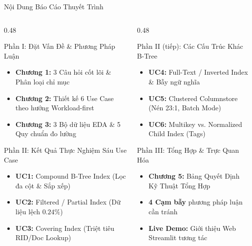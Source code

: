 \documentclass[aspectratio=169,9pt]{beamer}
\begin{document}
\begin{frame}{Nội Dung Báo Cáo Thuyết Trình}
\begin{columns}[T]
\begin{column}{0.48\textwidth}
\begin{block}{Phần I: Đặt Vấn Đề \& Phương Pháp Luận}
\begin{itemize}
  \item \textbf{Chương 1:} 3 Câu hỏi cốt lõi \& Phân loại chỉ mục
  \item \textbf{Chương 2:} Thiết kế 6 Use Case theo hướng Workload-first
  \item \textbf{Chương 3:} 3 Bộ dữ liệu EDA \& 5 Quy chuẩn đo lường
\end{itemize}
\end{block}
\begin{block}{Phần II: Kết Quả Thực Nghiệm Sáu Use Case}
\begin{itemize}
  \item \textbf{UC1:} Compound B-Tree Index (Lọc đa cột \& Sắp xếp)
  \item \textbf{UC2:} Filtered / Partial Index (Dữ liệu lệch $0.24\%$)
  \item \textbf{UC3:} Covering Index (Triệt tiêu RID/Doc Lookup)
\end{itemize}
\end{block}
\end{column}

\begin{column}{0.48\textwidth}
\begin{block}{Phần II (tiếp): Các Cấu Trúc Khác B-Tree}
\begin{itemize}
  \item \textbf{UC4:} Full-Text / Inverted Index \& Bẫy ngữ nghĩa
  \item \textbf{UC5:} Clustered Columnstore (Nén 23:1, Batch Mode)
  \item \textbf{UC6:} Multikey vs. Normalized Child Index (Tags)
\end{itemize}
\end{block}
\begin{block}{Phần III: Tổng Hợp \& Trực Quan Hóa}
\begin{itemize}
  \item \textbf{Chương 5:} Bảng Quyết Định Kỹ Thuật Tổng Hợp
  \item \textbf{4 Cạm bẫy} phương pháp luận cần tránh
  \item \textbf{Live Demo:} Giới thiệu Web Streamlit tương tác
\end{itemize}
\end{block}
\end{column}
\end{columns}
\end{frame}
\end{document}
